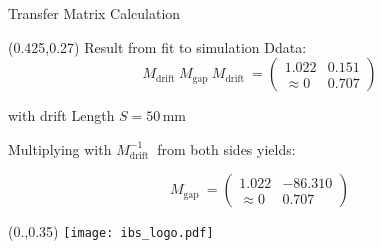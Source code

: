 \documentclass[10pt,aspectratio=169]{beamer}
\begin{document}
\begin{frame}{Transfer Matrix Calculation}
    \begin{textblock*}{0.5\paperwidth}(0.425\paperwidth,0.27\paperheight)
        \centering
        Result from fit to simulation Ddata:
        \begin{equation*}
            M_\text{drift  } M_\text{gap  } M_\text{drift  } = \begin{pmatrix} 1.022 & 0.151 \\ \approx 0 & 0.707 \end{pmatrix}
        \end{equation*}

        with drift Length $S=50$\,mm

         \vspace{0.1\paperheight}
        
        Multiplying with $M_\text{drift  }^{-1}$ from both sides yields: 

        \begin{equation*}
            M_\text{gap  } = \begin{pmatrix} 1.022 & -86.310  \\ \approx 0 & 0.707 \end{pmatrix}
        \end{equation*}

            
    \end{textblock*}
    \begin{textblock*}{0.5\paperwidth}(0.\paperwidth,0.35\paperheight)
		\centering
		\texttt{[image: ibs\_logo.pdf]}
	\end{textblock*}
  

\end{frame}
\end{document}
